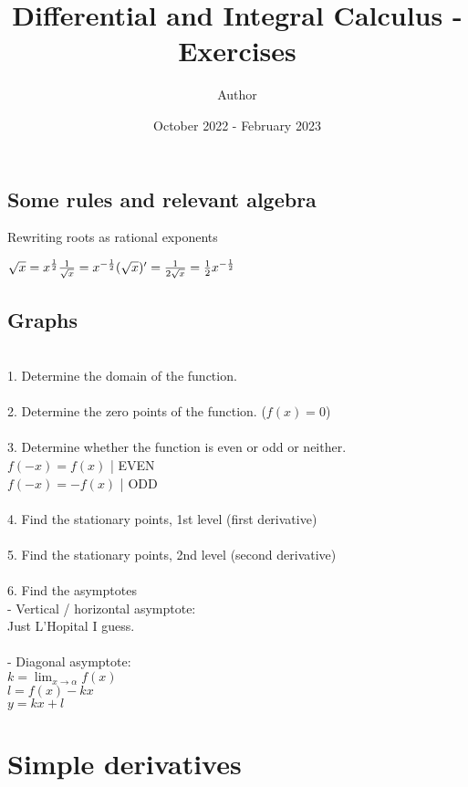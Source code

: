 \documentclass{article}
\title{Differential and Integral Calculus - Exercises}
\author{Author}
\date{October 2022 - February 2023}
\begin{document}
\maketitle

\subsection{Some rules and relevant algebra}
Rewriting roots as rational exponents

$
\\
\sqrt{x} = x^{\frac{1}{2}}
\\
\\
\frac{1}{\sqrt{x}} = x^{-\frac{1}{2}}
\\
\\
(\sqrt{x})' = \frac{1}{2\sqrt{x}} = \frac{1}{2}x^{-\frac{1}{2}}
$

\subsection{Graphs}
\\
1. Determine the domain of the function.
\\
\\
2. Determine the zero points of the function. ($f(x) = 0$)
\\
\\
3. Determine whether the function is even or odd or neither.
\\
$f(-x) = f(x)$ | EVEN
\\
$f(-x) = -f(x)$ | ODD
\\
\\
4. Find the stationary points, 1st level (first derivative)
\\
\\
5. Find the stationary points, 2nd level (second derivative)
\\
\\
6. Find the asymptotes
\\
- Vertical / horizontal asymptote:
\\
Just L'Hopital I guess.
\\
\\
- Diagonal asymptote: 
\\
$k = \lim_{x\to\alpha} f(x)$
\\
$l = f(x)-kx$
\\
$y = kx + l$

\pagebreak

\section{Simple derivatives}
\end{document}
